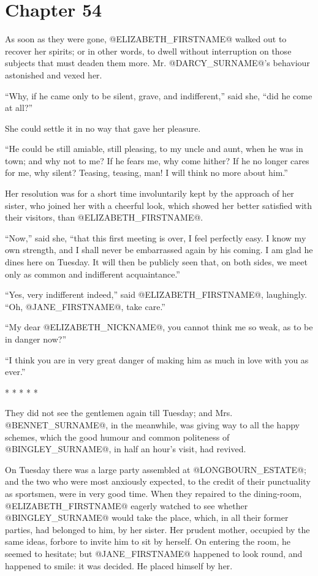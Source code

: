 \chapter*{Chapter 54}


As soon as they were gone, @ELIZABETH_FIRSTNAME@ walked out to recover her spirits;
or in other words, to dwell without interruption on those subjects that
must deaden them more. Mr. @DARCY_SURNAME@'s behaviour astonished and vexed her.

``Why, if he came only to be silent, grave, and indifferent,'' said she,
``did he come at all?''

She could settle it in no way that gave her pleasure.

``He could be still amiable, still pleasing, to my uncle and aunt, when
he was in town; and why not to me? If he fears me, why come hither? If
he no longer cares for me, why silent? Teasing, teasing, man! I will
think no more about him.''

Her resolution was for a short time involuntarily kept by the approach
of her sister, who joined her with a cheerful look, which showed her
better satisfied with their visitors, than @ELIZABETH_FIRSTNAME@.

``Now,'' said she, ``that this first meeting is over, I feel perfectly
easy. I know my own strength, and I shall never be embarrassed again by
his coming. I am glad he dines here on Tuesday. It will then be publicly
seen that, on both sides, we meet only as common and indifferent
acquaintance.''

``Yes, very indifferent indeed,'' said @ELIZABETH_FIRSTNAME@, laughingly. ``Oh, @JANE_FIRSTNAME@,
take care.''

``My dear @ELIZABETH_NICKNAME@, you cannot think me so weak, as to be in danger now?''

``I think you are in very great danger of making him as much in love with
you as ever.''

                          * * * * *

They did not see the gentlemen again till Tuesday; and Mrs. @BENNET_SURNAME@, in
the meanwhile, was giving way to all the happy schemes, which the good
humour and common politeness of @BINGLEY_SURNAME@, in half an hour's visit, had
revived.

On Tuesday there was a large party assembled at @LONGBOURN_ESTATE@; and the two
who were most anxiously expected, to the credit of their punctuality
as sportsmen, were in very good time. When they repaired to the
dining-room, @ELIZABETH_FIRSTNAME@ eagerly watched to see whether @BINGLEY_SURNAME@ would take
the place, which, in all their former parties, had belonged to him, by
her sister. Her prudent mother, occupied by the same ideas, forbore
to invite him to sit by herself. On entering the room, he seemed to
hesitate; but @JANE_FIRSTNAME@ happened to look round, and happened to smile: it was
decided. He placed himself by her.

